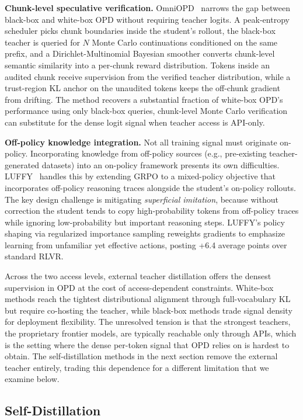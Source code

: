 \documentclass{article} %
\begin{document}
\textbf{Chunk-level speculative verification.} OmniOPD~\citep{2606.01476} narrows the gap between black-box and white-box OPD without requiring teacher logits. A peak-entropy scheduler picks chunk boundaries inside the student's rollout, the black-box teacher is queried for $N$ Monte Carlo continuations conditioned on the same prefix, and a Dirichlet-Multinomial Bayesian smoother converts chunk-level semantic similarity into a per-chunk reward distribution. Tokens inside an audited chunk receive supervision from the verified teacher distribution, while a trust-region KL anchor on the unaudited tokens keeps the off-chunk gradient from drifting. The method recovers a substantial fraction of white-box OPD's performance using only black-box queries, chunk-level Monte Carlo verification can substitute for the dense logit signal when teacher access is API-only.

\textbf{Off-policy knowledge integration.} Not all training signal must originate on-policy. Incorporating knowledge from off-policy sources (e.g., pre-existing teacher-generated datasets) into an on-policy framework presents its own difficulties. LUFFY~\citep{2504.14945} handles this by extending GRPO to a mixed-policy objective that incorporates off-policy reasoning traces alongside the student's on-policy rollouts. The key design challenge is mitigating \emph{superficial imitation}, because without correction the student tends to copy high-probability tokens from off-policy traces while ignoring low-probability but important reasoning steps. LUFFY's policy shaping via regularized importance sampling reweights gradients to emphasize learning from unfamiliar yet effective actions, posting +6.4 average points over standard RLVR.

Across the two access levels, external teacher distillation offers the densest supervision in OPD at the cost of access-dependent constraints. White-box methods reach the tightest distributional alignment through full-vocabulary KL but require co-hosting the teacher, while black-box methods trade signal density for deployment flexibility. The unresolved tension is that the strongest teachers, the proprietary frontier models, are typically reachable only through APIs, which is the setting where the dense per-token signal that OPD relies on is hardest to obtain. The self-distillation methods in the next section remove the external teacher entirely, trading this dependence for a different limitation that we examine below.

\subsection{Self-Distillation}
\label{subsec:self_distill}
\end{document}
